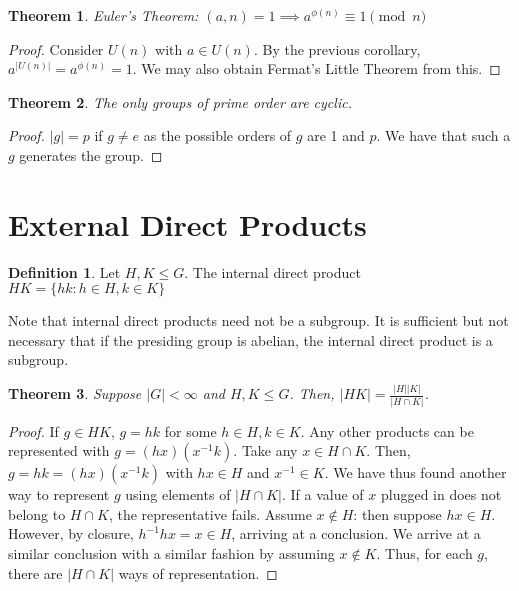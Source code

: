 \documentclass{article}
\theoremstyle{definition}
\newtheorem{definition}{Definition}
\theoremstyle{plain}
\newtheorem{theorem}{Theorem}
\theoremstyle{corollary}
\theoremstyle{lemma}
\begin{document}
\begin{theorem}
    Euler's Theorem: $(a,n)=1\implies a^{\phi(n)}\equiv1\pmod{n}$
\end{theorem}

\begin{proof}
    Consider $U(n)$ with $a\in U(n)$. By the previous corollary, $a^{|U(n)|}=a^{\phi(n)}=1$. We may also obtain Fermat's Little Theorem from this.
\end{proof}

\begin{theorem}
    The only groups of prime order are cyclic.
\end{theorem}

\begin{proof}
    $|g|=p$ if $g\neq e$ as the possible orders of $g$ are 1 and $p$. We have that such a $g$ generates the group. 
\end{proof}

\section{External Direct Products}

\begin{definition}
Let $H,K\leq G$. The internal direct product $HK=\{hk:h\in H,k\in K\}$
\end{definition}

Note that internal direct products need not be a subgroup. It is sufficient but not necessary that if the presiding group is abelian, the internal direct product is a subgroup.

\begin{theorem}
Suppose $|G|<\infty$ and $H,K\leq G$. Then, $|HK|=\frac{|H||K|}{|H\cap K|}$.
\end{theorem}

\begin{proof}
If $g\in HK$, $g=hk$ for some $h\in H,k\in K$. Any other products can be represented with $g=(hx)(x^{-1}k)$. Take any $x\in H\cap K$. Then, $g=hk=(hx)(x^{-1}k)$ with $hx\in H$ and $x^{-1}\in K$. We have thus found another way to represent $g$ using elements of $|H\cap K|$. If a value of $x$ plugged in does not belong to $H\cap K$, the representative fails. Assume $x\notin H$: then suppose $hx\in H$. However, by closure, $h^{-1}hx=x\in H$, arriving at a conclusion. We  arrive at a similar conclusion with a similar fashion by assuming $x\notin K$. Thus, for each $g$, there are $|H\cap K|$ ways of representation. 
\end{proof}
\end{document}
